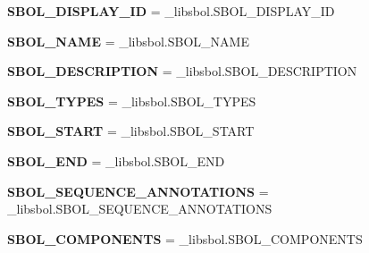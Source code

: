 \begin{DoxyCompactItemize}
\item 
{\bfseries S\+B\+O\+L\+\_\+\+D\+I\+S\+P\+L\+A\+Y\+\_\+\+ID} = \+\_\+libsbol.\+S\+B\+O\+L\+\_\+\+D\+I\+S\+P\+L\+A\+Y\+\_\+\+ID\hypertarget{namespacesbol_1_1libsbol_af86cfd28eb4c03280bf8abc99f1f0c29}{}\label{namespacesbol_1_1libsbol_af86cfd28eb4c03280bf8abc99f1f0c29}

\item 
{\bfseries S\+B\+O\+L\+\_\+\+N\+A\+ME} = \+\_\+libsbol.\+S\+B\+O\+L\+\_\+\+N\+A\+ME\hypertarget{namespacesbol_1_1libsbol_a8db99e35b948cf7447532311d7a01e44}{}\label{namespacesbol_1_1libsbol_a8db99e35b948cf7447532311d7a01e44}

\item 
{\bfseries S\+B\+O\+L\+\_\+\+D\+E\+S\+C\+R\+I\+P\+T\+I\+ON} = \+\_\+libsbol.\+S\+B\+O\+L\+\_\+\+D\+E\+S\+C\+R\+I\+P\+T\+I\+ON\hypertarget{namespacesbol_1_1libsbol_a9dd2cc73a1578518e3d440a5a4116d5a}{}\label{namespacesbol_1_1libsbol_a9dd2cc73a1578518e3d440a5a4116d5a}

\item 
{\bfseries S\+B\+O\+L\+\_\+\+T\+Y\+P\+ES} = \+\_\+libsbol.\+S\+B\+O\+L\+\_\+\+T\+Y\+P\+ES\hypertarget{namespacesbol_1_1libsbol_a5e08b8d950837e938918bb0b4590f8e4}{}\label{namespacesbol_1_1libsbol_a5e08b8d950837e938918bb0b4590f8e4}

\item 
{\bfseries S\+B\+O\+L\+\_\+\+S\+T\+A\+RT} = \+\_\+libsbol.\+S\+B\+O\+L\+\_\+\+S\+T\+A\+RT\hypertarget{namespacesbol_1_1libsbol_a1fd8f26a50ca276caab77dd3b6b64657}{}\label{namespacesbol_1_1libsbol_a1fd8f26a50ca276caab77dd3b6b64657}

\item 
{\bfseries S\+B\+O\+L\+\_\+\+E\+ND} = \+\_\+libsbol.\+S\+B\+O\+L\+\_\+\+E\+ND\hypertarget{namespacesbol_1_1libsbol_ae8d767ba046a0575e63e694f28391e22}{}\label{namespacesbol_1_1libsbol_ae8d767ba046a0575e63e694f28391e22}

\item 
{\bfseries S\+B\+O\+L\+\_\+\+S\+E\+Q\+U\+E\+N\+C\+E\+\_\+\+A\+N\+N\+O\+T\+A\+T\+I\+O\+NS} = \+\_\+libsbol.\+S\+B\+O\+L\+\_\+\+S\+E\+Q\+U\+E\+N\+C\+E\+\_\+\+A\+N\+N\+O\+T\+A\+T\+I\+O\+NS\hypertarget{namespacesbol_1_1libsbol_af9faf7637cd380ffa599b113bbf0717d}{}\label{namespacesbol_1_1libsbol_af9faf7637cd380ffa599b113bbf0717d}

\item 
{\bfseries S\+B\+O\+L\+\_\+\+C\+O\+M\+P\+O\+N\+E\+N\+TS} = \+\_\+libsbol.\+S\+B\+O\+L\+\_\+\+C\+O\+M\+P\+O\+N\+E\+N\+TS\hypertarget{namespacesbol_1_1libsbol_a369af9e2afea5e1cb940499f1b15aeb1}{}\label{namespacesbol_1_1libsbol_a369af9e2afea5e1cb940499f1b15aeb1}


\end{DoxyCompactItemize}
